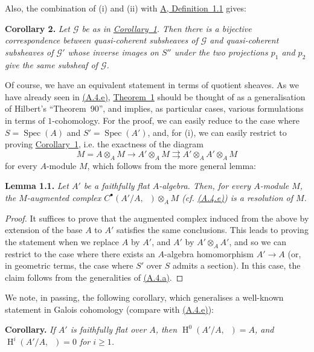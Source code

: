 \documentclass{article}
\newenvironment{itenv}[1]
  {\phantomsection\par\medskip\noindent\textbf{#1.}\itshape}
  {\par\medskip}
\newcommand{\scr}[1]{{\mathscr{#1}}}
\renewcommand{\geq}{\geqslant}
\DeclareMathOperator{\HH}{H}
\DeclareMathOperator{\Ga}{G_a}
\DeclareMathOperator{\Spec}{Spec}
\begin{document}
Also, the combination of (i) and (ii) with \hyperref[definition:A.1.1]{A, Definition~1.1} gives:

\begin{itenv}{Corollary 2}
\label{corollary:B.1(2)}
  Let $\scr{G}$ be as in \hyperref[corollary:B.1(1)]{Corollary~1}.
  Then there is a bijective correspondence between quasi-coherent subsheaves of $\scr{G}$ and quasi-coherent subsheaves of $\scr{G}'$ whose inverse images on $S''$ under the two projections $p_1$ and $p_2$ give the same subsheaf of $\scr{G}$.
\end{itenv}

Of course, we have an equivalent statement in terms of quotient sheaves.
As we have already seen in \hyperref[A.4.e]{(A.4.e)}, \hyperref[theorem:B.1(1)]{Theorem~1} should be thought of as a generalisation of Hilbert's ``Theorem~90'', and implies, as particular cases, various formulations in terms of $1$-cohomology.
For the proof, we can easily reduce to the case where $S=\Spec(A)$ and $S'=\Spec(A')$, and, for (i), we can easily restrict to proving \hyperref[corollary:B.1(1)]{Corollary~1}, i.e. the exactness of the diagram
\[
  M
  = A\otimes_A M
  \to A'\otimes_A M
  \rightrightarrows A'\otimes_A A'\otimes_A M
\]
for every $A$-module $M$, which follows from the more general lemma:

\begin{itenv}{Lemma 1.1}
  Let $A'$ be a faithfully flat $A$-algebra.
  Then, for every $A$-module $M$, the $M$-augmented complex $C^\bullet(A'/A,\Ga)\otimes_A M$ (cf. \hyperref[A.4.e]{(A.4.e)}) is a \emph{resolution} of $M$.
\end{itenv}

\begin{proof}
  It suffices to prove that the augmented complex induced from the above by extension of the base $A$ to $A'$ satisfies the same conclusions.
  This leads to proving the statement when we replace $A$ by $A'$, and $A'$ by $A'\otimes_A A'$, and so we can restrict to the case where there exists an $A$-algebra homomorphism $A'\to A$ (or, in geometric terms, the case where $S'$ over $S$ admits a section).
  In this case, the claim follows from the generalities of \hyperref[A.4.a]{(A.4.a)}.
\end{proof}

We note, in passing, the following corollary, which generalises a well-known statement in Galois cohomology (compare with \hyperref[A.4.e]{(A.4.e)}):

\begin{itenv}{Corollary}
  If $A'$ is faithfully flat over $A$, then $\HH^0(A'/A,\Ga)=A$, and $\HH^i(A'/A,\Ga)=0$ for $i\geq1$.
\end{itenv}
\end{document}
